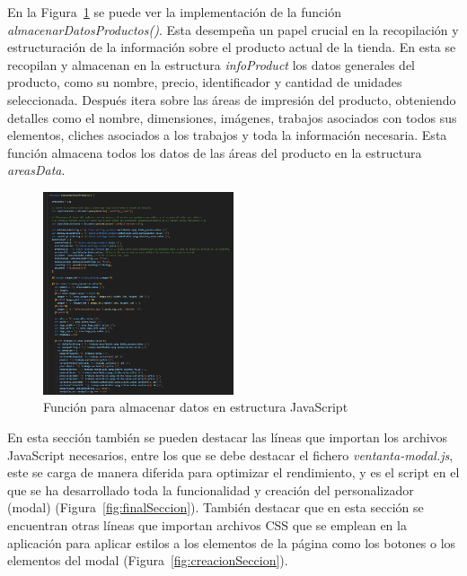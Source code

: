 \documentclass[11pt]{article}
\begin{document}
En la Figura~\ref{fig:cargardatos} se puede ver la implementación de la función \textit{almacenarDatosProductos()}. Esta desempeña un papel crucial en 
la recopilación y estructuración de la información sobre el producto actual de la tienda. En esta se recopilan y almacenan en la estructura \textit{infoProduct} los datos generales del producto, como su nombre, precio, identificador y cantidad de
unidades seleccionada. Después itera sobre las áreas de impresión del producto, obteniendo detalles como el nombre, dimensiones, imágenes, trabajos asociados con todos sus elementos, cliches asociados a los trabajos y toda la información necesaria. Esta función
almacena todos los datos de las áreas del producto en la estructura \textit{areasData}.


\begin{figure}[H]
    \centering
    \includegraphics[width=0.5\textwidth]{imagenesUS3-section/funcionAlmacenarDatosProductos.png}
    \caption{\label{fig:cargardatos} Función para almacenar datos en estructura JavaScript}
    \vspace{\fill}
\end{figure}

En esta sección también se pueden destacar las líneas que importan los archivos JavaScript necesarios, entre los que se debe destacar
el fichero \textit{ventanta-modal.js}, este se carga de manera diferida para optimizar el rendimiento, y es el script en el que se ha desarrollado toda la funcionalidad y creación del
personalizador (modal) (Figura~\ref{fig:finalSeccion}). También destacar que en esta sección se encuentran otras líneas que importan archivos CSS que se emplean en la aplicación para aplicar estilos 
a los elementos de la página como los botones o los elementos del modal (Figura~\ref{fig:creacionSeccion}).
\end{document}
